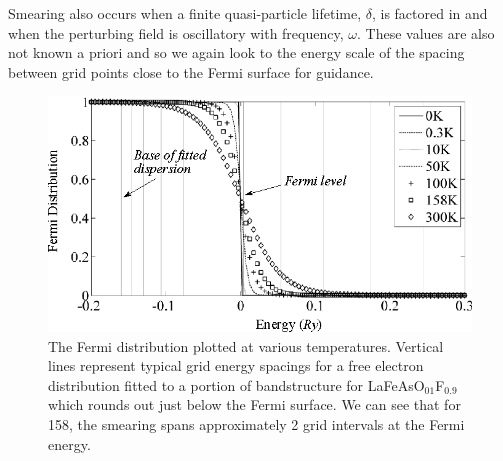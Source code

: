 Smearing also occurs when a finite quasi-particle lifetime, $\delta$, is factored in and when the perturbing field is oscillatory with frequency, $\omega$. These values are also not known a priori and so we again look to the energy scale of the spacing between grid points close to the Fermi surface for guidance.

\begin{figure}[htbp]
    \begin{center}
        \includegraphics[scale=0.9]{Chapter-ExperimentalTechnique/Figures/Susceptibility/TempSmearing/TempSmearing}
        \caption{The Fermi distribution plotted at various temperatures. Vertical lines represent typical grid energy spacings for a free electron distribution fitted to a portion of bandstructure for LaFeAsO$_{01}$F$_{0.9}$ which rounds out just below the Fermi surface. We can see that for \unit{158}{\kelvin}, the smearing spans approximately 2 grid intervals at the Fermi energy.}
        \label{Fig:Exp:SusceptibilityTempSmearing}
    \end{center}
\end{figure}

